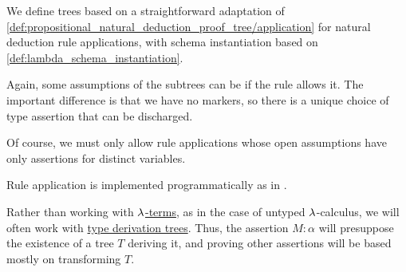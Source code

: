 \begin{definition}
\begin{thmenum}[resume=def:type_derivation_tree]
     We define  trees based on a straightforward adaptation of \cref{def:propositional_natural_deduction_proof_tree/application} for natural deduction rule applications, with schema instantiation based on \cref{def:lambda_schema_instantiation}.

    Again, some assumptions of the subtrees can be  if the rule allows it. The important difference is that we have no markers, so there is a unique choice of type assertion that can be discharged.

    Of course, we must only allow rule applications whose open assumptions have only assertions for distinct variables.
  \end{thmenum}
\end{definition}
\begin{comments}
  \item Rule application is implemented programmatically as  in \cite{notebook:code}.
\end{comments}

\begin{remark}\label{rem:type_derivation_tree_focus}
  Rather than working with \hyperref[def:lambda_term]{\( {\mathrm \lambda} \)-terms}, as in the case of untyped \( {\mathrm \lambda} \)-calculus, we will often work with \hyperref[def:type_derivation_tree]{type derivation trees}. Thus, the assertion \( M: \alpha \) will presuppose the existence of a tree \( T \) deriving it, and proving other assertions will be based mostly on transforming \( T \).
\end{remark}

